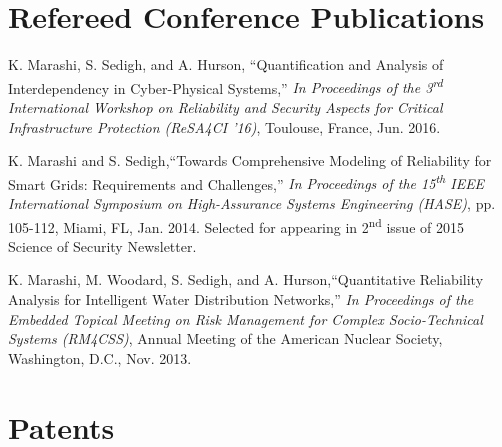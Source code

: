 \documentclass[10pt]{article}
\newlength{\Vspace}
\newlength{\Vspace}
\newlength{\VspacePub}
\begin{document}
\ifResume
\else
\section{Refereed Conference Publications}

\begin{flushleft}
K. Marashi, S. Sedigh, and A. Hurson, ``Quantification and Analysis of Interdependency in Cyber-Physical Systems,'' \textit{In Proceedings of the 3\textsuperscript{rd} International Workshop on Reliability and Security Aspects for Critical Infrastructure Protection (ReSA4CI '16)}, Toulouse, France, Jun. 2016. \\ \vspace{\VspacePub}

K. Marashi and S. Sedigh,``Towards Comprehensive Modeling of Reliability for Smart Grids: Requirements and Challenges,''
\textit{In Proceedings of the 15\textsuperscript{th} IEEE International Symposium on High-Assurance Systems Engineering (HASE)}, pp. 105-112, Miami, FL, Jan. 2014. Selected for appearing in 2\textsuperscript{nd} issue of 2015 Science of Security Newsletter. \\ \vspace{\VspacePub}

K. Marashi, M. Woodard, S. Sedigh, and A. Hurson,``Quantitative Reliability Analysis for Intelligent Water Distribution Networks,'' \textit{In Proceedings of the Embedded Topical Meeting on Risk Management for Complex Socio-Technical Systems (RM4CSS)}, Annual Meeting of the American Nuclear Society, Washington, D.C., Nov. 2013.

\end{flushleft}
\fi

\section{Patents}
\end{document}
